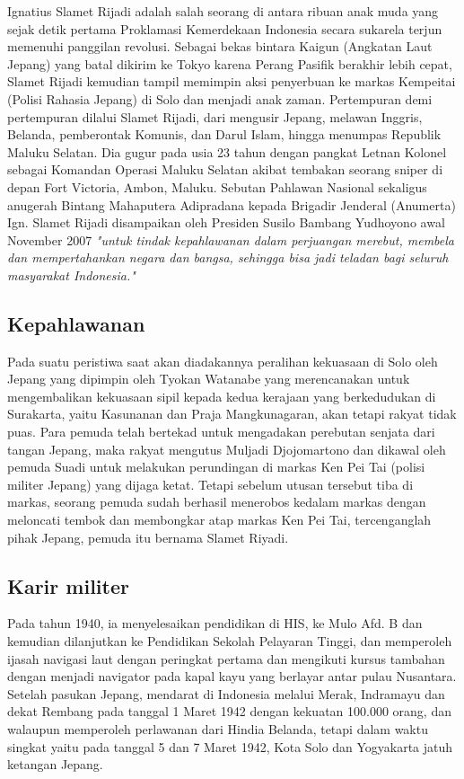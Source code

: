 Ignatius Slamet Rijadi adalah salah seorang di antara ribuan anak muda yang sejak detik pertama Proklamasi Kemerdekaan Indonesia secara sukarela terjun memenuhi panggilan revolusi. Sebagai bekas bintara Kaigun (Angkatan Laut Jepang) yang batal dikirim ke Tokyo karena Perang Pasifik berakhir lebih cepat, Slamet Rijadi kemudian tampil memimpin aksi penyerbuan ke markas Kempeitai (Polisi Rahasia Jepang) di Solo dan menjadi anak zaman. Pertempuran demi pertempuran dilalui Slamet Rijadi, dari mengusir Jepang, melawan Inggris, Belanda, pemberontak Komunis, dan Darul Islam, hingga menumpas Republik Maluku Selatan. Dia gugur pada usia 23 tahun dengan pangkat Letnan Kolonel sebagai Komandan Operasi Maluku Selatan akibat tembakan seorang sniper di depan Fort Victoria, Ambon, Maluku. Sebutan Pahlawan Nasional sekaligus anugerah Bintang Mahaputera Adipradana kepada Brigadir Jenderal (Anumerta) Ign. Slamet Rijadi disampaikan oleh Presiden Susilo Bambang Yudhoyono awal November 2007 \textit{"untuk tindak kepahlawanan dalam perjuangan merebut, membela dan mempertahankan negara dan bangsa, sehingga bisa jadi teladan bagi seluruh masyarakat Indonesia."}

\subsection*{Kepahlawanan}

Pada suatu peristiwa saat akan diadakannya peralihan kekuasaan di Solo oleh Jepang yang dipimpin oleh Tyokan Watanabe yang merencanakan untuk mengembalikan kekuasaan sipil kepada kedua kerajaan yang berkedudukan di Surakarta, yaitu Kasunanan dan Praja Mangkunagaran, akan tetapi rakyat tidak puas. Para pemuda telah bertekad untuk mengadakan perebutan senjata dari tangan Jepang, maka rakyat mengutus Muljadi Djojomartono dan dikawal oleh pemuda Suadi untuk melakukan perundingan di markas Ken Pei Tai (polisi militer Jepang) yang dijaga ketat. Tetapi sebelum utusan tersebut tiba di markas, seorang pemuda sudah berhasil menerobos kedalam markas dengan meloncati tembok dan membongkar atap markas Ken Pei Tai, tercenganglah pihak Jepang, pemuda itu bernama Slamet Riyadi.


\subsection*{Karir militer}

Pada tahun 1940, ia menyelesaikan pendidikan di HIS, ke Mulo Afd. B dan kemudian dilanjutkan ke Pendidikan Sekolah Pelayaran Tinggi, dan memperoleh ijasah navigasi laut dengan peringkat pertama dan mengikuti kursus tambahan dengan menjadi navigator pada kapal kayu yang berlayar antar pulau Nusantara. Setelah pasukan Jepang, mendarat di Indonesia melalui Merak, Indramayu dan dekat Rembang pada tanggal 1 Maret 1942 dengan kekuatan 100.000 orang, dan walaupun memperoleh perlawanan dari Hindia Belanda,  tetapi dalam waktu singkat yaitu pada tanggal 5 dan 7 Maret 1942,  Kota Solo dan Yogyakarta jatuh ketangan Jepang.

